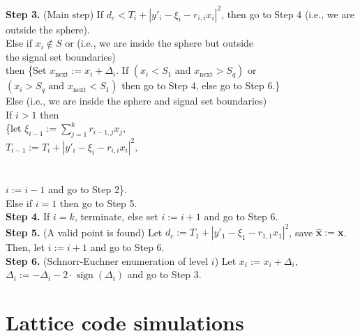 \documentclass[english,12pt,a4paper,pdftex,sci,utf8]{aaltothesis}
\begin{document}
\noindent \textbf{Step 3.} (Main step) If $d_c < T_i + \left|y'_i-\xi_i-r_{i,i}x_i\right|^2$, then go to Step 4 (i.e., we are\\
\indent outside the sphere).\\
\indent Else if $x_i \not\in S$ or  (i.e., we are inside the sphere but outside \\
\indent the signal set boundaries) \\ 
\indent then \{Set $x_{\text{next}} := x_i + \Delta_i$. If $(x_i < S_1\,\, \text{and}\,\, x_{\text{next}} > S_q)$ or \\
\indent $(x_i > S_q\,\, \text{and}\,\, x_{\text{next}} < S_{1})$ then go to Step 4, else go to Step 6.\}  \\
\indent Else (i.e., we are inside the sphere and signal set boundaries) \\
\indent\indent If $i > 1$ then \\
\indent\indent\indent \{let $\xi_{i-1} := \sum_{j=1}^{k} r_{i-1,j}x_j,$\\ 
\indent\indent\indent $T_{i-1} := T_i + \left|y'_i-\xi_i-r_{i,i}x_i\right|^2,$\\
\indent\indent\indent {} \\
\indent\indent\indent {}\\
\indent\indent\indent $i := i - 1$ and go to Step 2\}. \\
\indent\indent Else if $i=1$ then go to Step 5. \\

\noindent \textbf{Step 4.} If $i = k$, terminate, else set $i := i+1$ and go to Step 6.\\

\noindent \textbf{Step 5.} (A valid point is found) Let $d_c := T_1 + \left|y'_1-\xi_1-r_{1,1}x_1\right|^2$, save $\mathbf{\hat{x}} := \mathbf{x}$. \\
\indent Then, let $i := i+1$ and go to Step 6.\\

\noindent \textbf{Step 6.} (Schnorr-Euchner enumeration of level $i$) Let $x_i := x_i + \Delta_i,$\\
\indent $\Delta_i := -\Delta_i - 2\cdot\operatorname{sign}(\Delta_i)  $ and go to Step 3.\\

\clearpage

\section{Lattice code simulations}
\end{document}
